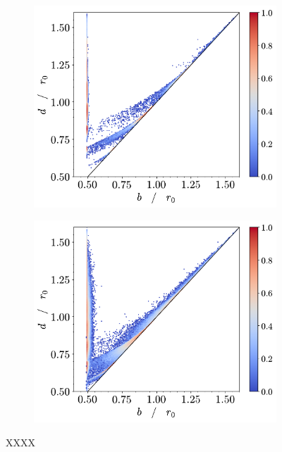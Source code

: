 \begin{figure}[tb]
     \begin{subfigure}[b]{0.48\textwidth}
         \centering
         \includegraphics[width=\textwidth]{./figures/ph/t-2700_tr_pd.pdf}
         \caption{}
         \label{fig:trpdc}
     \end{subfigure}
     \hfill
      \begin{subfigure}[b]{0.48\textwidth}
         \centering
         \includegraphics[width=\textwidth]{./figures/ph/t-1800_tr_pd.pdf}
         \caption{}
         \label{fig:trpdd}
     \end{subfigure}
     \hfill
    
	\caption{XXXX}
	\label{fig:}
\end{figure}


